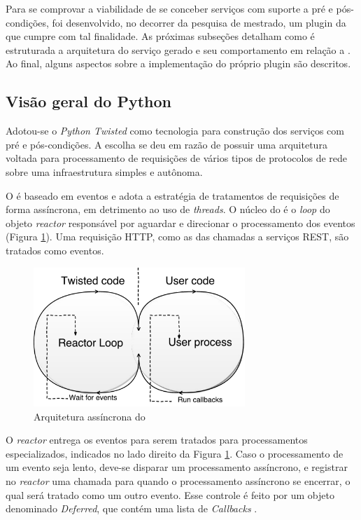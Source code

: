 Para se comprovar a viabilidade de se conceber serviços com suporte a pré e
pós-condições, foi desenvolvido, no decorrer da pesquisa de mestrado, um plugin
da \neoidl{} que cumpre com tal finalidade. As próximas subseções detalham como
é estruturada a arquitetura do serviço gerado e seu comportamento em relação a
\designbycontract{}. Ao final, alguns aspectos sobre a implementação do
próprio plugin são descritos.

\subsection{Visão geral do Python \twisted{}}
\label{PythonTwisted}

Adotou-se o \framework{} \emph{Python Twisted}\cite{fettig2005twisted} como tecnologia para
construção dos serviços com pré e pós-condições. A escolha se deu em razão de
\twisted{} possuir uma arquitetura voltada para processamento de requisições de vários
tipos de protocolos de rede sobre uma infraestrutura simples e autônoma. 

O \twisted{} é baseado em eventos e adota a estratégia de tratamentos de
requisições de forma assíncrona, em detrimento ao uso de \textit{threads}. O
núcleo do \twisted{} é o \textit{loop} do objeto \emph{reactor} responsável por
aguardar e direcionar o processamento dos eventos (Figura
\ref{Fig:TwistedReactor}). Uma requisição HTTP, como as das chamadas a serviços REST, são tratados como
eventos.

\begin{figure}[!htb]
\centering
\includegraphics[width=80mm,trim = 0mm 0mm 0mm
0mm,clip]{img/TwistedReactor.pdf}
\caption{Arquitetura assíncrona do \twisted{}}
\label{Fig:TwistedReactor}
\end{figure}

O \emph{reactor} entrega os eventos para serem tratados para processamentos
especializados, indicados no lado direito da Figura \ref{Fig:TwistedReactor}.
Caso o processamento de um evento seja lento, deve-se disparar um
processamento assíncrono, e registrar no \emph{reactor} uma chamada para quando
o processamento assíncrono se encerrar, o qual será tratado como um outro
evento.
Esse controle é feito por um objeto denominado \emph{Deferred}, que contém uma lista
de \emph{Callbacks} \cite{fettig2005twisted}.


